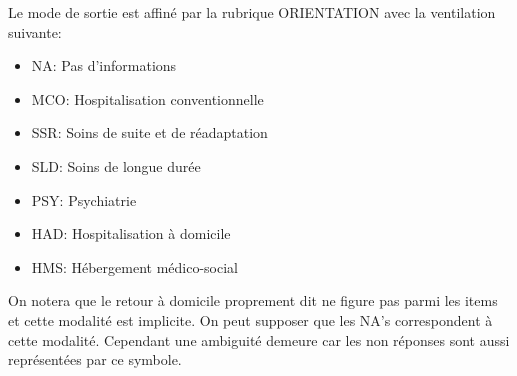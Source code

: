 \documentclass[12pt,english,french,twoside]{book}\usepackage[]{graphicx}\usepackage[]{color}
\begin{document}
Le mode de sortie est affiné par la rubrique ORIENTATION avec la ventilation suivante:

\begin{itemize}
  \item NA:    Pas d'informations
  \item MCO:		Hospitalisation conventionnelle
  \item SSR:		Soins de suite et de réadaptation
  \item SLD:		Soins de longue durée
  \item PSY: 		Psychiatrie
  \item HAD:		Hospitalisation à domicile
  \item HMS:		Hébergement médico-social
\end{itemize}

On notera que le retour à domicile proprement dit ne figure pas parmi les items et cette modalité est implicite. On peut supposer que les NA's correspondent à cette modalité. Cependant une ambiguité demeure car les non réponses sont aussi représentées par ce symbole.
\end{document}
